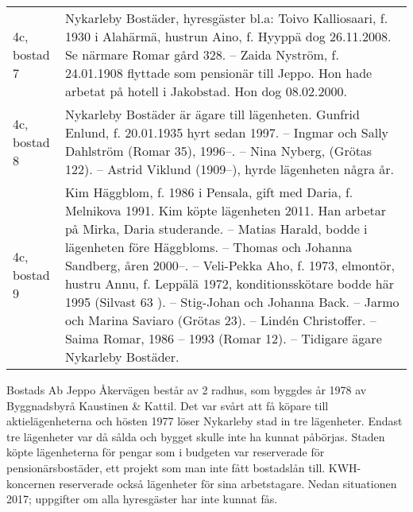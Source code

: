 \begin{center}
  \begin{longtable}{l p{}}
    \hline
    4c, bostad 7 & Nykarleby Bostäder, hyresgäster bl.a: Toivo Kalliosaari, f. 1930 i Alahärmä, hustrun Aino, f. Hyyppä dog 26.11.2008. Se närmare Romar gård 328. -- Zaida Nyström, f. 24.01.1908 flyttade som pensionär till Jeppo. Hon hade arbetat på hotell i Jakobstad. Hon dog 08.02.2000. \\
    4c, bostad 8 & Nykarleby Bostäder är ägare till lägenheten. Gunfrid Enlund, f. 20.01.1935 hyrt sedan 1997. -- Ingmar och Sally Dahlström (Romar 35), 1996--\allowbreak 1997. -- Nina Nyberg, (Grötas 122).	-- Astrid Viklund (1909--\allowbreak 1992), hyrde lägenheten några år. \\
    4c, bostad 9 & Kim Häggblom, f. 1986 i Pensala, gift med Daria, f. Melnikova 1991. Kim köpte lägenheten  2011. Han arbetar på Mirka, Daria studerande. -- Matias Harald, bodde i lägenheten före Häggbloms. -- Thomas och Johanna Sandberg, åren 2000--\allowbreak 2003.	-- Veli-Pekka Aho, f. 1973, elmontör, hustru Annu, f. Leppälä 1972, konditionsskötare bodde här 1995  (Silvast 63 ). -- Stig-Johan och Johanna Back. -- Jarmo och Marina Saviaro (Grötas 23). -- Lindén Christoffer. -- Saima Romar,  1986 – 1993 (Romar 12). -- Tidigare ägare  Nykarleby Bostäder. \\
    \hline
  \end{longtable}
\end{center}



%


%
Bostads Ab Jeppo Åkervägen består av 2 radhus, som byggdes år 1978 av Byggnadsbyrå Kaustinen \& Kattil. Det var svårt att få köpare till aktielägenheterna och hösten 1977 löser Nykarleby stad in tre lägenheter. Endast tre lägenheter var då sålda och bygget skulle inte ha kunnat påbörjas. Staden köpte lägenheterna för pengar som i budgeten var reserverade för pensionärsbostäder, ett projekt som man inte fått bostadslån till. KWH-koncernen reserverade också lägenheter för sina arbetstagare. Nedan situationen 2017; uppgifter om alla hyresgäster har inte kunnat fås.

